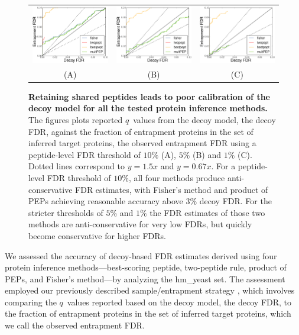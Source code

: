 \documentclass{article}
\begin{document}
\begin{figure}
\begin{center}
\begin{tabular}{ccc} 
\includegraphics[width=0.3\linewidth]
  {./img/shared-pept-accuracy-fdr10} &
\includegraphics[width=0.3\linewidth]
  {./img/shared-pept-accuracy-fdr5} & 
\includegraphics[width=0.3\linewidth]
  {./img/shared-pept-accuracy-fdr1}\\
(A) & (B) & (C)
\end{tabular}
\caption{\label{fig:shared-accuracy}\textbf{Retaining shared peptides
    leads to poor calibration of the decoy model for all the tested
    protein inference methods.} The figures plots reported $q$~values
  from the decoy model, the decoy FDR, against the fraction of
  entrapment proteins in the set of inferred target proteins, the
  observed entrapment FDR using a peptide-level FDR threshold of
  $10\%$ (A), $5\%$ (B) and $1\%$ (C). Dotted lines correspond to
  $y=1.5x$ and $y=0.67x$.  For a peptide-level FDR threshold of
  $10\%$, all four methods produce anti-conservative FDR estimates,
  with Fisher's method and product of PEPs achieving reasonable
  accuracy above $3\%$ decoy FDR. For the stricter thresholds of $5\%$
  and $1\%$ the FDR estimates of those two methods are
  anti-conservative for very low FDRs, but quickly become conservative
  for higher FDRs.}
\end{center}
\end{figure}

We assessed the accuracy of decoy-based FDR estimates derived using
four protein inference methods---best-scoring peptide, two-peptide
rule, product of PEPs, and Fisher's method---by analyzing the
hm\_yeast set.  The assessment employed our previously described
sample/entrapment strategy \cite{granholm2013determining}, which
involves comparing the $q$~values reported based on the decoy model,
the decoy FDR, to the fraction of entrapment proteins in the set of
inferred target proteins, which we call the observed entrapment FDR.
\end{document}

